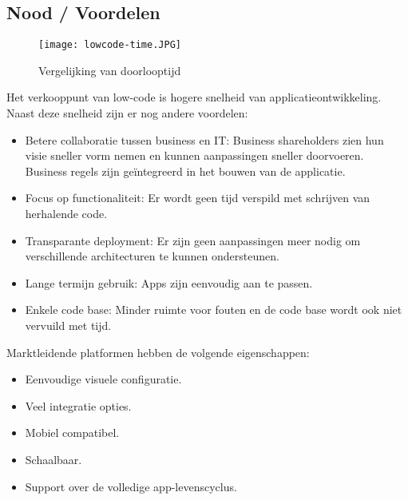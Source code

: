 \autocite{Richardson2016}

\subsection{Nood / Voordelen}

\begin{figure}[h!]
    \texttt{[image: lowcode-time.JPG]}
    \caption{Vergelijking van doorlooptijd \autocite{Richardson2016}}
    \label{fig:tijdverschil}
\end{figure}

Het verkooppunt van low-code is hogere snelheid van applicatieontwikkeling. Naast deze snelheid zijn er nog andere voordelen:
\begin{itemize}
    \item Betere collaboratie tussen business en IT: Business shareholders zien hun visie sneller vorm nemen en kunnen aanpassingen sneller doorvoeren. Business regels zijn geïntegreerd in het bouwen van de applicatie.
    \item Focus op functionaliteit: Er wordt geen tijd verspild met schrijven van herhalende code.
    \item Transparante deployment: Er zijn geen aanpassingen meer nodig om verschillende architecturen te kunnen ondersteunen.
    \item Lange termijn gebruik: Apps zijn eenvoudig aan te passen.
    \item Enkele code base: Minder ruimte voor fouten en de code base wordt ook niet vervuild met tijd.
\end{itemize} \autocite{Schetsen2016}

Marktleidende platformen hebben de volgende eigenschappen:
\begin{itemize}
    \item Eenvoudige visuele configuratie.
    \item Veel integratie opties.
    \item Mobiel compatibel.
    \item Schaalbaar.
    \item Support over de volledige app-levenscyclus.
\end{itemize} \autocite{Kissflow2018}

